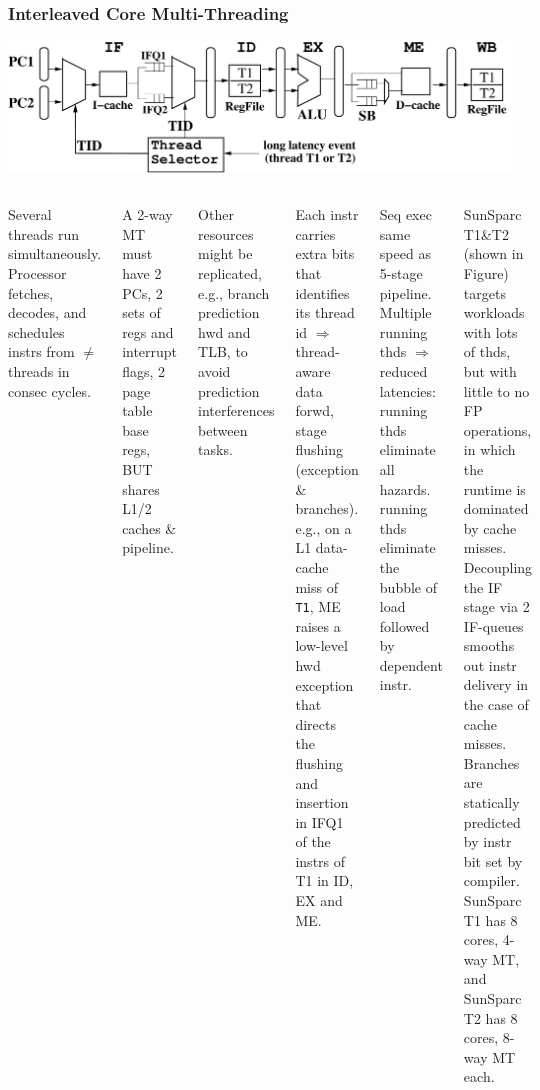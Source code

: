 \documentclass{beamer}
\renewcommand{\emph}[1]{\textcolor{structure}{#1}}
\newcommand{\emp}[1]{\textcolor{DikuRed}{ #1}}
\begin{document}
\begin{frame}[fragile,t]
\frametitle{Interleaved Core Multi-Threading}
\vspace{-1ex}
\includegraphics[width=55ex]{Figures/InterleavedMT}
\smallskip

\begin{scriptsize}
\begin{columns}
Several threads run simultaneously.
Processor fetches, decodes, and schedules 
instrs from $\neq$ threads in consec cycles.\smallskip

A 2-way MT \emp{must have 2 PCs, 2 sets of regs and interrupt flags, 
2 page table base regs}, \emph{BUT shares L1/2 caches \&
pipeline}.\smallskip

Other resources might be replicated, e.g., branch prediction hwd and TLB,
to avoid prediction interferences between tasks.\smallskip

Each instr carries extra bits that identifies its thread id $\Rightarrow$
thread-aware data forwd, stage flushing (exception \& branches).
e.g., on a L1 data-cache miss of {\tt T1}, ME raises a low-level
hwd exception that directs the flushing and insertion
in IFQ1 of the instrs of T1 in ID, EX and ME.\smallskip

\emp{Seq exec same speed as 5-stage pipeline.}
\emph{Multiple running thds $\Rightarrow$ reduced latencies:} running thds eliminate all hazards. running thds eliminate the bubble of load followed by dependent instr.\smallskip

\alert{SunSparc T1\&T2} (shown in Figure) targets workloads with lots of thds, 
but with little to no FP operations, in which the runtime is dominated by cache misses. 
Decoupling the IF stage via 2 IF-queues smooths out instr delivery in the case of cache 
misses.   Branches are statically predicted by instr bit set by compiler. 
SunSparc T1 has 8 cores, 4-way MT, and SunSparc T2 has 8 cores, 8-way MT each. 

\end{columns}
\end{scriptsize}

\end{frame}
\end{document}
